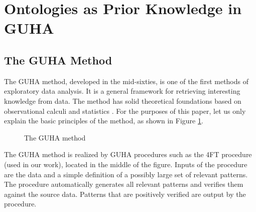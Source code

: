 \section{Ontologies as Prior Knowledge in GUHA} \label{OntologiesAssociation}

\subsection{The GUHA Method}
\label{section:guha}
The GUHA method, developed in the mid-sixties, is one of the first methods of exploratory data analysis. 
It is a general framework for retrieving interesting knowledge from data. 
The method has solid theoretical foundations based on observational calculi and statistics \cite{GUHA}. 
For the purposes of this paper, let us only explain the basic principles of the method, as shown in Figure \ref{fig:GUHA}.

\begin{figure}[ht]
\centering
\mbox{}
\caption{The GUHA method}
\label{fig:GUHA}
\end{figure}

The GUHA method is realized by GUHA procedures such as the 4FT procedure (used in our work), located in the middle of the figure. 
Inputs of the procedure are the data and a simple definition of a possibly large set of relevant patterns. 
The procedure automatically generates all relevant patterns and verifies them against the source data. 
Patterns that are positively verified are output by the procedure.

